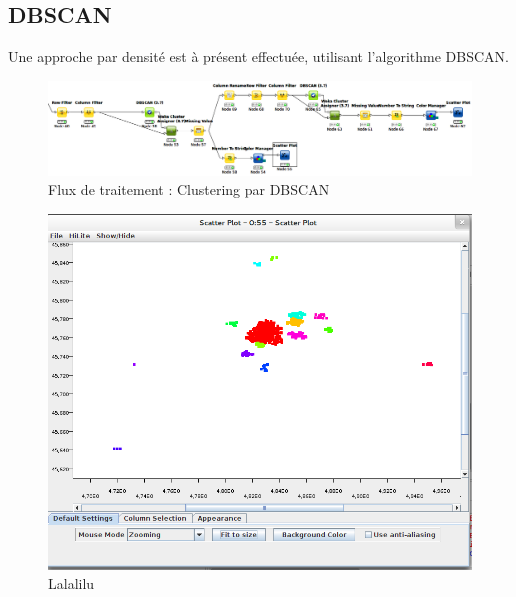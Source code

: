 \subsection{DBSCAN}
Une approche par densité est à présent effectuée, utilisant l'algorithme DBSCAN.

\begin{figure}[H]
    \centering
    \includegraphics[width=\linewidth]{img/knime_dbscan.png}
    \caption{Flux de traitement : Clustering par DBSCAN}
\end{figure}

\begin{figure}[H]
    \centering
    \includegraphics[width=\linewidth]{img/dbscan_50.png}
    \caption{Lalalilu}
\end{figure}

